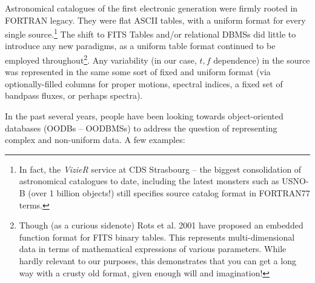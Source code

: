\documentclass[]{lofar}
\begin{document}
  Astronomical catalogues of the first electronic generation were firmly rooted
  in FORTRAN legacy. They were flat ASCII tables, with a uniform format for every
  single source.\footnote{In fact, the {\em VizieR} service at CDS Strasbourg
  \cite{vizier} -- the biggest consolidation of astronomical catalogues to date,
  including the latest monsters such as USNO-B (over 1 billion objects!) still
  specifies source catalog format in FORTRAN77 terms.} The shift to FITS Tables and/or
  relational DBMSs did little to introduce any new paradigms, as a uniform table
  format continued to be employed throughout\footnote{Though  (as a curious
  sidenote) Rots et al. 2001 \cite{FEF} have proposed an embedded function format
  for FITS binary tables. This represents multi-dimensional data in terms of
  mathematical expressions of various parameters. While hardly relevant to our
  purposes, this demonstrates that you can get a long way with a crusty old
  format, given enough will and imagination!}. 
  Any variability (in our case,
  $t,f$ dependence) in the source was represented in the same some sort of fixed
  and uniform format (via optionally-filled columns for proper motions, spectral
  indices, a fixed set of bandpass fluxes, or perhaps spectra).
  
  In the past several years, people have been looking towards object-oriented
  databases (OODBs -- OODBMSs) to address the question of representing complex
  and non-uniform data. A few examples:
  
\end{document}
